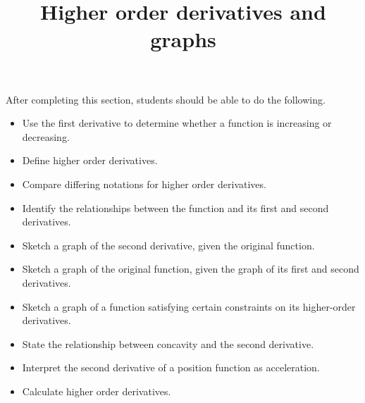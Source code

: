 \documentclass{ximera}
\title{Higher order derivatives and graphs}
\begin{document}
\begin{abstract}
\end{abstract}

\maketitle

\begin{sectionOutcomes}

After completing this section, students should be able to do the following.


\begin{itemize}
\item Use the first derivative to determine whether a function is increasing or decreasing.
\item Define higher order derivatives.
\item Compare differing notations for higher order derivatives.
\item Identify the relationships between the function and its first and second derivatives.
\item Sketch a graph of the second derivative, given the original function.
\item Sketch a graph of the original function, given the graph of its first and second derivatives.
\item Sketch a graph of a function satisfying certain constraints on its higher-order derivatives.
\item State the relationship between concavity and the second derivative.
\item Interpret the second derivative of a position function as acceleration.
\item Calculate higher order derivatives.

\end{itemize}
\end{sectionOutcomes}
\end{document}

